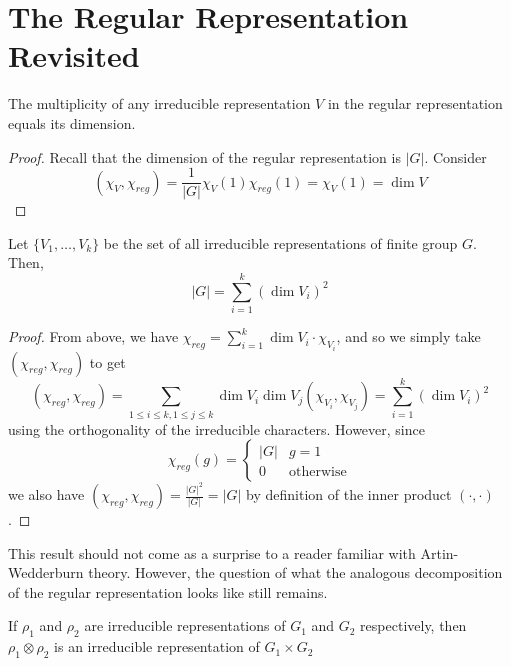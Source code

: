 \documentclass[11pt,leqno,oneside]{amsbook}
\numberwithin{thm}{section}
\begin{document}
\section{The Regular Representation Revisited}
\begin{cor}
  The multiplicity of any irreducible representation \(V\) in the regular
  representation equals its dimension.
\end{cor}
\begin{proof}
  Recall that the dimension of the regular representation is \(|G|\). Consider \[
    (\chi_V, \chi_{reg}) = \frac{1}{|G|}\chi_V(1) \chi_{reg}(1) =
    \chi_V(1) = \dim V
  \]
\end{proof}
\begin{cor}
  Let \(\{V_1, \ldots, V_k\}\) be the set of all irreducible
  representations of finite group \(G\). Then, \[
    |G| = \sum_{i=1}^k (\dim V_i)^2
  \]
\end{cor}
\begin{proof}
  From above, we have \(\chi_{reg} = \sum_{i=1}^k \dim V_i \cdot
  \chi_{V_i}\), and so we simply take \((\chi_{reg}, \chi_{reg})\) to
  get \[
    (\chi_{reg}, \chi_{reg}) = \sum_{1\leq i \leq k, 1 \leq j \leq k}
    \dim V_i \dim V_j (\chi_{V_i}, \chi_{V_j}) = \sum_{i=1}^k (\dim
    V_i)^2
  \]
  using the orthogonality of the irreducible characters. However,
  since \[
    \chi_{reg}(g) =
    \begin{cases}
      |G| & g = 1 \\
      0 & \text{otherwise}
    \end{cases}
  \]
  we also have \((\chi_{reg}, \chi_{reg}) = \frac{|G|^2}{|G|} = |G|\)
  by definition of the inner product \((\cdot, \cdot)\).
\end{proof}
\begin{rmk}
  This result should not come as a surprise to a reader familiar with
  Artin-Wedderburn theory. However, the question of what the
  analogous decomposition of the regular representation looks like
  still remains. 
\end{rmk}
\begin{lem}\label{tensor-of-irred-is-irred}
  If \(\rho_1\) and \(\rho_2\) are irreducible representations of
  \(G_1\) and \(G_2\) respectively, then
  \(\rho_1 \otimes \rho_2\) is an irreducible representation of \(G_1
  \times G_2\)
\end{lem}
\end{document}
